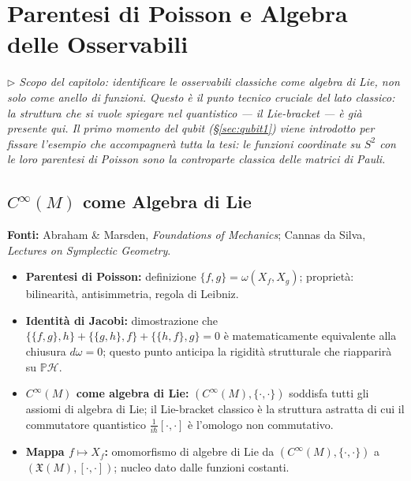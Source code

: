 \documentclass[12pt, a4paper]{article}
\newcommand{\fonti}[1]{%
	\begin{fontebox}
		\textcolor{fontecolor}{\footnotesize\textbf{Fonti:} #1}
	\end{fontebox}%
}
\newcommand{\nota}[1]{%
	\par\smallskip
	\noindent\textit{\small $\triangleright$\; #1}
	\par\smallskip
}
\begin{document}
	\section{Parentesi di Poisson e Algebra delle Osservabili}
	
	\nota{Scopo del capitolo: identificare le osservabili classiche come algebra di Lie,
		non solo come anello di funzioni. Questo è il punto tecnico cruciale del lato
		classico: la struttura che si vuole spiegare nel quantistico --- il Lie-bracket ---
		è già presente qui. Il primo momento del qubit (§\ref{sec:qubit1}) viene introdotto
		per fissare l'esempio che accompagnerà tutta la tesi: le funzioni coordinate su $S^2$
		con le loro parentesi di Poisson sono la controparte classica delle matrici di Pauli.}
	
	\subsection{$C^\infty(M)$ come Algebra di Lie}
	
	\fonti{Abraham \& Marsden, \textit{Foundations of Mechanics}; Cannas da Silva,
		\textit{Lectures on Symplectic Geometry}.}
	
	\begin{itemize}
		\item \textbf{Parentesi di Poisson:} definizione $\{f, g\} = \omega(X_f, X_g)$;
		proprietà: bilinearità, antisimmetria, regola di Leibniz.
		\item \textbf{Identità di Jacobi:} dimostrazione che $\{\{f,g\},h\} + \{\{g,h\},f\}
		+ \{\{h,f\},g\} = 0$ è matematicamente equivalente alla chiusura $d\omega = 0$;
		questo punto anticipa la rigidità strutturale che riapparirà su $\mathbb{P}\mathcal{H}$.
		\item \textbf{$C^\infty(M)$ come algebra di Lie:} $(C^\infty(M), \{\cdot,\cdot\})$
		soddisfa tutti gli assiomi di algebra di Lie; il Lie-bracket classico è la
		struttura astratta di cui il commutatore quantistico $\frac{1}{i\hbar}[\cdot,\cdot]$
		è l'omologo non commutativo.
		\item \textbf{Mappa $f \mapsto X_f$:} omomorfismo di algebre di Lie da
		$(C^\infty(M), \{\cdot,\cdot\})$ a $(\mathfrak{X}(M), [\cdot,\cdot])$; nucleo
		dato dalle funzioni costanti.
	\end{itemize}
	
\end{document}
